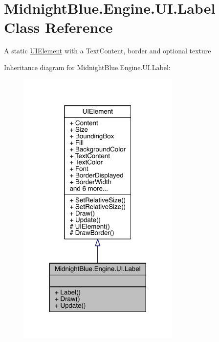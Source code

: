 \hypertarget{class_midnight_blue_1_1_engine_1_1_u_i_1_1_label}{}\section{Midnight\+Blue.\+Engine.\+U\+I.\+Label Class Reference}
\label{class_midnight_blue_1_1_engine_1_1_u_i_1_1_label}


A static \hyperlink{class_midnight_blue_1_1_engine_1_1_u_i_1_1_u_i_element}{U\+I\+Element} with a Text\+Content, border and optional texture  




Inheritance diagram for Midnight\+Blue.\+Engine.\+U\+I.\+Label\+:
\nopagebreak
\begin{figure}[H]
\begin{center}
\leavevmode
\includegraphics[width=228pt]{class_midnight_blue_1_1_engine_1_1_u_i_1_1_label__inherit__graph}
\end{center}
\end{figure}


